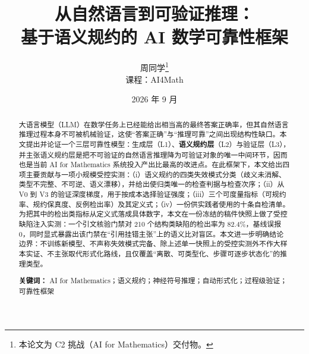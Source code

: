 \documentclass[11pt,fontset=fandol,a4paper]{ctexart}
\title{\bfseries 从自然语言到可验证推理：\\ 基于语义规约的 AI 数学可靠性框架}
\author{周同学\thanks{本论文为 C2 挑战（AI for Mathematics）交付物。} \\ \small 课程：AI4Math}
\date{2026 年 9 月}
\begin{document}
\maketitle

\begin{abstract}
\noindent
大语言模型（LLM）在数学任务上已经能给出相当高的最终答案正确率，但其自然语言推理过程本身不可被机械验证，这使“答案正确”与“推理可靠”之间出现结构性缺口。本文提出并论证一个三层可靠性模型：生成层（L1）、\textbf{语义规约层}（L2）与验证层（L3），并主张语义规约层是把不可验证的自然语言推理降为可验证对象的唯一中间环节，因而也是当前 AI for Mathematics 系统投入产出比最高的改进点。在此框架下，本文给出四项主要贡献与一项小规模受控实测：（i）语义规约的四类失效模式分类（歧义未消解、类型不完整、不可逆、语义漂移），并给出使归类唯一的检查判据与检查次序；（ii）从 V0 到 V3 的验证深度梯度，用于按成本选择验证强度；（iii）三个可度量指标（可规约率、规约保真度、反例检出率）及其定义式；（iv）一份供实践者使用的十条自检清单。为把其中的检出类指标从定义式落成具体数字，本文在一份冻结的稿件快照上做了受控缺陷注入实测：一个引文核验门禁对 210 个结构类缺陷的检出率为 82.4\%，基线误报 0，同时显式暴露出该门禁在“引用挂错主张”上的语义比对盲区。本文进一步明确结论边界：不训练新模型、不声称失效模式完备、除上述单一快照上的受控实测外不作大样本实证、不主张取代形式化路线，且仅覆盖“离散、可类型化、步骤可逐步状态化”的推理类型。

\vspace{0.6em}
\noindent\textbf{关键词：} AI for Mathematics；语义规约；神经符号推理；自动形式化；过程级验证；可靠性框架
\end{abstract}
\end{document}
